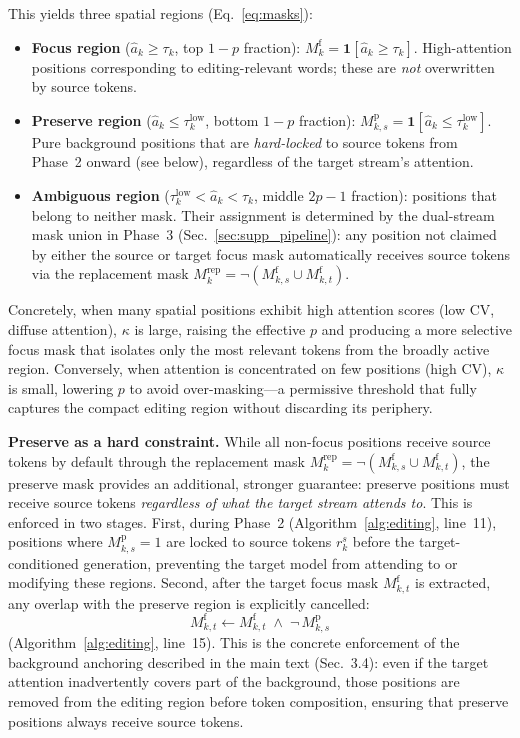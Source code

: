 This yields three spatial regions (Eq.~\eqref{eq:masks}):
\begin{itemize}
    \item \textbf{Focus region} ($\hat{a}_k \ge \tau_k$, top $1{-}p$ fraction): $M_k^{\mathrm{f}} = \mathbf{1}[\hat{a}_k \ge \tau_k]$. High-attention positions corresponding to editing-relevant words; these are \textit{not} overwritten by source tokens.
    \item \textbf{Preserve region} ($\hat{a}_k \le \tau_k^{\mathrm{low}}$, bottom $1{-}p$ fraction): $M_{k,s}^{\mathrm{p}} = \mathbf{1}[\hat{a}_k \le \tau_k^{\mathrm{low}}]$. Pure background positions that are \textit{hard-locked} to source tokens from Phase~2 onward (see below), regardless of the target stream's attention.
    \item \textbf{Ambiguous region} ($\tau_k^{\mathrm{low}} < \hat{a}_k < \tau_k$, middle $2p{-}1$ fraction): positions that belong to neither mask. Their assignment is determined by the dual-stream mask union in Phase~3 (Sec.~\ref{sec:supp_pipeline}): any position not claimed by either the source or target focus mask automatically receives source tokens via the replacement mask $M_k^{\mathrm{rep}} = \neg(M_{k,s}^{\mathrm{f}} \cup M_{k,t}^{\mathrm{f}})$.
\end{itemize}

Concretely, when many spatial positions exhibit high attention scores (low CV, diffuse attention), $\kappa$ is large, raising the effective $p$ and producing a more selective focus mask that isolates only the most relevant tokens from the broadly active region.
Conversely, when attention is concentrated on few positions (high CV), $\kappa$ is small, lowering $p$ to avoid over-masking---a permissive threshold that fully captures the compact editing region without discarding its periphery.

\noindent\textbf{Preserve as a hard constraint.}
While all non-focus positions receive source tokens by default through the replacement mask $M_k^{\mathrm{rep}} = \neg(M_{k,s}^{\mathrm{f}} \cup M_{k,t}^{\mathrm{f}})$, the preserve mask provides an additional, stronger guarantee: preserve positions must receive source tokens \emph{regardless of what the target stream attends to}. This is enforced in two stages.
First, during Phase~2 (Algorithm~\ref{alg:editing}, line~11), positions where $M_{k,s}^{\mathrm{p}}{=}1$ are locked to source tokens $r_k^s$ before the target-conditioned generation, preventing the target model from attending to or modifying these regions.
Second, after the target focus mask $M_{k,t}^{\mathrm{f}}$ is extracted, any overlap with the preserve region is explicitly cancelled:
\begin{equation}
    M_{k,t}^{\mathrm{f}} \gets M_{k,t}^{\mathrm{f}} \;\wedge\; \neg\, M_{k,s}^{\mathrm{p}}
    \label{eq:preserve_override}
\end{equation}
(Algorithm~\ref{alg:editing}, line~15). This is the concrete enforcement of the background anchoring described in the main text (Sec.~3.4): even if the target attention inadvertently covers part of the background, those positions are removed from the editing region before token composition, ensuring that preserve positions always receive source tokens.

